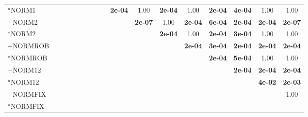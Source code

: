 \begin{table}[t]
{\begin{tabular}{lcccccccccccccccc}
*NORM1 &  &  &  &  &  &  &  &  & \textbf{2e-04} & 1.00 & \textbf{2e-04} & 1.00 & \textbf{2e-04} & \textbf{4e-04} & 1.00 & 1.00 \\
+NORM2 &  &  &  &  &  &  &  &  &  & \textbf{2e-07} & 1.00 & \textbf{2e-04} & \textbf{6e-04} & \textbf{2e-04} & \textbf{2e-04} & \textbf{2e-07} \\
*NORM2 &  &  &  &  &  &  &  &  &  &  & \textbf{2e-04} & 1.00 & \textbf{2e-04} & \textbf{3e-04} & 1.00 & 1.00 \\
+NORMROB &  &  &  &  &  &  &  &  &  &  &  & \textbf{2e-04} & \textbf{3e-04} & \textbf{2e-04} & \textbf{2e-04} & \textbf{2e-04} \\
*NORMROB &  &  &  &  &  &  &  &  &  &  &  &  & \textbf{2e-04} & \textbf{5e-04} & 1.00 & 1.00 \\
+NORM12 &  &  &  &  &  &  &  &  &  &  &  &  &  & \textbf{2e-04} & \textbf{2e-04} & \textbf{2e-04} \\
*NORM12 &  &  &  &  &  &  &  &  &  &  &  &  &  &  & \textbf{4e-02} & \textbf{2e-03} \\
+NORMFIX &  &  &  &  &  &  &  &  &  &  &  &  &  &  &  & 1.00 \\
*NORMFIX &  &  &  &  &  &  &  &  &  &  &  &  &  &  &  &  \\
\bottomrule
\end{tabular}
}
\end{table}


